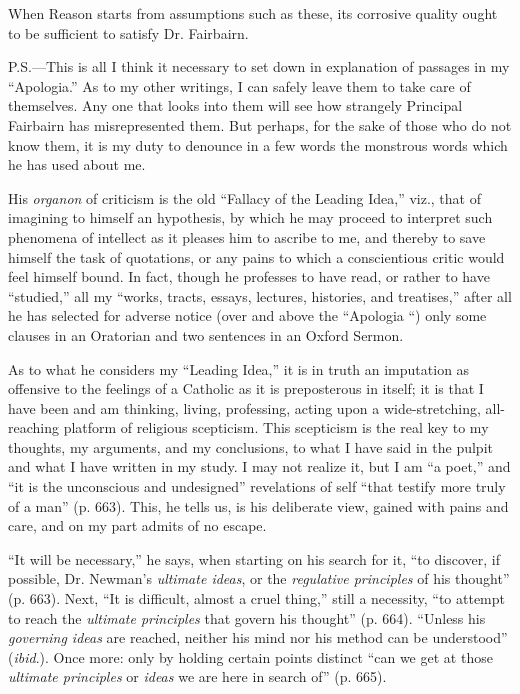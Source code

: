 When Reason starts from assumptions such as these, its corrosive
quality ought to be sufficient to satisfy Dr. Fairbairn.

P.S.—This is all I think it necessary to set down in explanation of
passages in my ``Apologia.'' As to my other writings, I can
safely leave them to take care of themselves. Any one that looks into
them will see how strangely Principal Fairbairn has misrepresented
them. But perhaps, for the sake of those who do not know them, it is
my duty to denounce in a few words the monstrous words which he has
used about me.

His \emph{organon} of criticism is the old ``Fallacy of the
Leading Idea,'' viz., that of imagining to himself an hypothesis,
by which he may proceed to interpret such phenomena of intellect as it
pleases him to ascribe to me, and thereby to save himself the task of
quotations, or any pains to which a conscientious critic would feel
himself bound. In fact, though he professes to have read, or rather to
have ``studied,'' all my ``works, tracts, essays,
lectures, histories, and treatises,'' after all he has selected
for adverse notice (over and above the ``Apologia ``) only
some clauses in an Oratorian and two sentences in an Oxford Sermon.

As to what he considers my ``Leading Idea,'' it is in truth
an imputation as offensive to the feelings of a Catholic as it is
preposterous in itself; it is that I have been and am thinking,
living, professing, acting upon a wide-stretching, all-reaching
platform of religious scepticism. This scepticism is the real key to
my thoughts, my arguments, and my conclusions, to what I have said in
the pulpit and what I have written in my study. I may not
realize it, but I am ``a poet,'' and ``it is the
unconscious and undesigned'' revelations of self ``that
testify more truly of a man'' (p. 663). This, he tells us, is his
deliberate view, gained with pains and care, and on my part admits of
no escape.

``It will be necessary,'' he says, when starting on his
search for it, ``to discover, if possible, Dr. Newman's \emph{ultimate
ideas}, or the \emph{regulative principles} of his thought''
(p. 663). Next, ``It is difficult, almost a cruel thing,''
still a necessity, ``to attempt to reach the \emph{ultimate
principles} that govern his thought'' (p. 664). ``Unless
his \emph{governing ideas} are reached, neither his mind nor his
method can be understood'' (\emph{ibid}.). Once more: only by
holding certain points distinct ``can we get at those \emph{ultimate
principles} or \emph{ideas} we are here in search of'' (p.
665).

